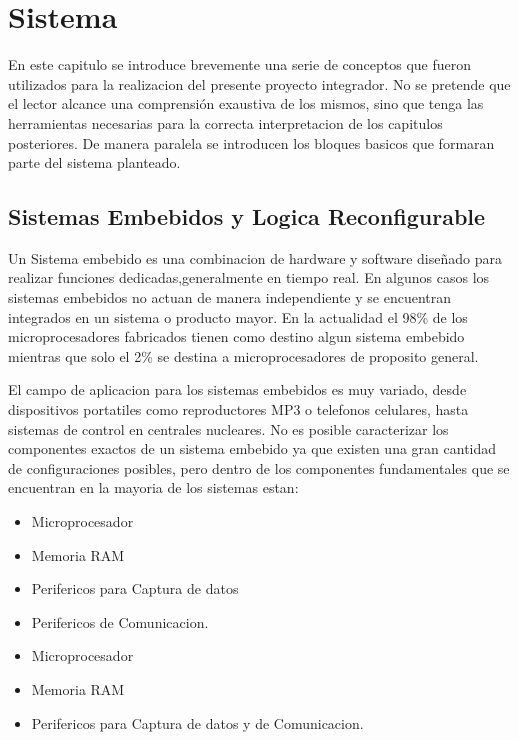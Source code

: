 \chapter{Sistema}
En este capitulo se introduce brevemente una serie de conceptos que fueron utilizados para la realizacion del presente proyecto integrador. No se pretende que el lector alcance una comprensión exaustiva de los mismos, sino que tenga las herramientas necesarias para la correcta interpretacion de los capitulos posteriores. De manera paralela se introducen los bloques basicos que formaran parte del sistema planteado.

\section{Sistemas Embebidos y Logica Reconfigurable}

Un Sistema embebido es una combinacion de hardware y software diseñado para realizar funciones dedicadas,generalmente en tiempo real. En algunos casos los sistemas embebidos no actuan de manera independiente y se encuentran integrados en un sistema o producto mayor.
En la actualidad el 98\% de los microprocesadores fabricados tienen como destino algun sistema embebido mientras que solo el 2\% se destina a microprocesadores de proposito general.

El campo de aplicacion para los sistemas embebidos es muy variado, desde dispositivos portatiles como reproductores MP3 o telefonos celulares, hasta sistemas de control en centrales nucleares.
No es posible caracterizar los componentes exactos de un sistema embebido ya que existen una gran cantidad de configuraciones posibles, pero dentro de los componentes fundamentales que se encuentran en la mayoria de los sistemas estan:

\begin{itemize}
\item Microprocesador
\item Memoria RAM
\item Perifericos para Captura de datos
\item Perifericos de Comunicacion.
\end{itemize}


\begin{itemize}
\item Microprocesador
\item Memoria RAM 
\item Perifericos para Captura de datos y de Comunicacion.
\end{itemize}


